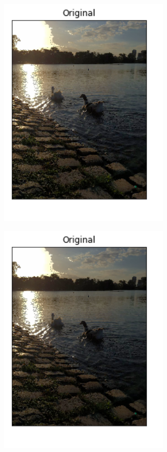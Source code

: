 \documentclass[10pt, a4paper]{article}
\begin{document}
\begin{figure}[H]
\begin{subfigure}{0.3\textwidth}
        \includegraphics[width=0.9\textwidth]{patitos-k4.png}
    \end{subfigure}\hfill	
    \centering
    \begin{subfigure}{0.3\textwidth}
        \includegraphics[width=0.9\textwidth]{patitos-k16.png}

\end{subfigure}
\end{figure}
\end{document}
